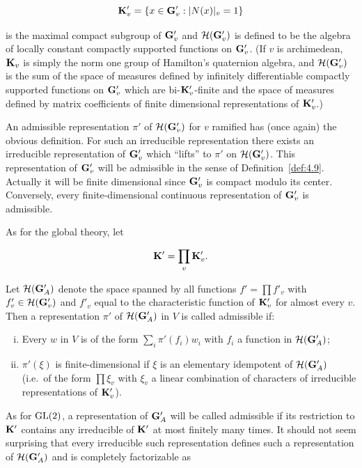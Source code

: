 \[
\mathbf{K}'_v = \{x \in \mathbf{G}'_v: |N(x)|_v = 1\}
\]

is the maximal compact subgroup of $\mathbf{G}'_v$ and $\mathcal{H}(\mathbf{G}'_v)$ is defined to be the algebra of locally constant compactly supported functions on $\mathbf{G}'_v$. (If $v$ is archimedean, $\mathbf{K}_v$ is simply the norm one group of Hamilton's quaternion algebra, and $\mathcal{H}(\mathbf{G}'_v)$ is the sum of the space of measures defined by infinitely differentiable compactly supported functions on $\mathbf{G}'_v$ which are bi-$\mathbf{K}'_v$-finite and the space of measures defined by matrix coefficients of finite dimensional representations of $\mathbf{K}'_v$.)

An admissible representation $\pi'$ of $\mathcal{H}(\mathbf{G}'_v)$ for $v$ ramified has (once again) the obvious definition. For such an irreducible representation there exists an irreducible representation of $\mathbf{G}'_v$ which ``lifts'' to $\pi'$ on $\mathcal{H}(\mathbf{G}'_v)$. This representation of $\mathbf{G}'_v$ will be admissible in the sense of Definition~\ref{def:4.9}. Actually it will be finite dimensional since $\mathbf{G}'_v$ is compact modulo its center. Conversely, every finite-dimensional continuous representation of $\mathbf{G}'_v$ is admissible.

As for the global theory, let

\[
\mathbf{K}' = \prod_v \mathbf{K}'_v.
\]

Let $\mathcal{H}(\mathbf{G}'_A)$ denote the space spanned by all functions $f' = \prod f'_v$ with $f'_v \in \mathcal{H}(\mathbf{G}'_v)$ and $f'_v$ equal to the characteristic function of $\mathbf{K}'_v$ for almost every $v$. Then a representation $\pi'$ of $\mathcal{H}(\mathbf{G}'_A)$ in $V$ is called admissible if:

\begin{enumerate}[(i)]

\item Every $w$ in $V$ is of the form $\sum_i \pi'(f_i)w_i$ with $f_i$ a function in $\mathcal{H}(\mathbf{G}'_A)$;

\item $\pi'(\xi)$ is finite-dimensional if $\xi$ is an elementary idempotent of $\mathcal{H}(\mathbf{G}'_A)$ (i.e.\ of the form $\prod \xi_v$ with $\xi_v$ a linear combination of characters of irreducible representations of $\mathbf{K}'_v$).

\end{enumerate}

As for $\operatorname{GL}(2)$, a representation of $\mathbf{G}'_A$ will be called admissible if its restriction to $\mathbf{K}'$ contains any irreducible of $\mathbf{K}'$ at most finitely many times. It should not seem surprising that every irreducible such representation defines such a representation of $\mathcal{H}(\mathbf{G}'_A)$ and is completely factorizable as

